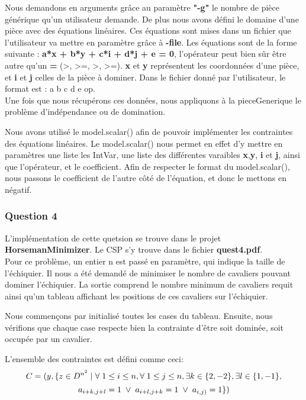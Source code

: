 \documentclass{article}
\begin{document}
Nous demandons en arguments grâce au paramètre \textbf{"-g"} le nombre de pièce générique qu'un utilisateur demande. De plus nous avons défini le domaine d'une pièce avec des équations linéaires. Ces équations sont mises dans un fichier que l'utilisateur va mettre en paramètre grâce à \textbf{-file}. Les équations sont de la forme suivante : \textbf{a*x + b*y + c*i + d*j + e = 0}, l'opérateur peut bien sûr être autre qu'un \textbf{=} (>, >=, >, >=). \textbf{x} et \textbf{y} représentent les coordonnées d'une pièce, et \textbf{i} et \textbf{j} celles de la pièce à dominer. Dans le fichier donné par l'utilisateur, le format est : a b c d e op. \\

Une fois que nous récupérons ces données, nous appliquons à la pieceGenerique le problème d'indépendance ou de domination. 

Nous avons utilisé le model.scalar() afin de pouvoir implémenter les contraintes des équations linéaires. Le model.scalar() nous permet en effet d'y mettre en paramètres une liste les IntVar, une liste des différentes varaibles \textbf{x},\textbf{y}, \textbf{i} et \textbf{j}, ainsi que l'opérateur, et le coefficient. Afin de respecter le format du model.scalar(), nous passons le coefficient de l'autre côté de l'équation, et donc le mettons en négatif.
	
\subsubsection{Question 4}
L'implémentation de cette quetsion se trouve dans le projet \textbf{HorsemanMinimizer}. Le CSP s'y trouve dans le fichier \textbf{quest4.pdf}. \\

Pour ce problème, un entier n est passé en paramètre, qui indique la taille de l'échiquier. Il nous a été demandé de minimiser le nombre de cavaliers pouvant dominer l'échiquier. La sortie comprend le nombre minimum de cavaliers requit ainsi qu'un tableau affichant les positions de ces cavaliers sur l'échiquier.

Nous commençons par initialisé toutes les cases du tableau. Ensuite, nous vérifions que chaque case respecte bien la contrainte d'être soit dominée, soit occupée par un cavalier. 

L'ensemble des contraintes est défini comme ceci:  
  $$ C = (y, \{z \in D^{n^2} \hspace{0.1cm} | \hspace{0.1cm} \forall \hspace{0.1cm} 1 \leq i \leq n, \forall \hspace{0.1cm} 1 \leq j \leq n, \exists k \in \{2,-2\}, \exists l \in \{1,-1\},$$
 $$ a_{i+k,j+l}=1 \hspace{0.1cm} \vee \hspace{0.1cm} a_{i+l,j+k}=1 \hspace{0.1cm} \vee \hspace{0.1cm} a_{i,j)} = 1\}) $$ 
 
\end{document}
